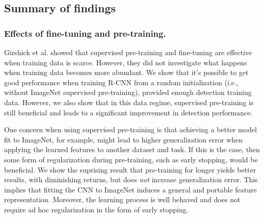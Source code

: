 
\subsection{Summary of findings}

\subsubsection{Effects of fine-tuning and pre-training.} 
Girshick et al. \cite{Rcnn} showed that supervised pre-training and fine-tuning are effective when training data is scarce.
However, they did not investigate what happens when training data becomes more abundant.
We show that it's possible to get good performance when training R-CNN from a random initialization (i.e., without ImageNet supervised pre-training), provided enough detection training data.
However, we also show that in this data regime, supervised pre-training is still beneficial and leads to a significant improvement in detection performance.

One concern when using supervised pre-training is that achieving a better model fit to ImageNet, for example, might lead to higher generalization error when applying the learned features to another dataset and task.
If this is the case, then some form of regularization during pre-training, such as early stopping, would be beneficial.
We show the suprising result that pre-training for longer yields better results, with diminishing returns, but does \emph{not} increase generalization error.
This implies that fitting the CNN to ImageNet induces a general and portable feature representation.
Moreover, the learning process is well behaved and does not require ad hoc regularization in the form of early stopping.



